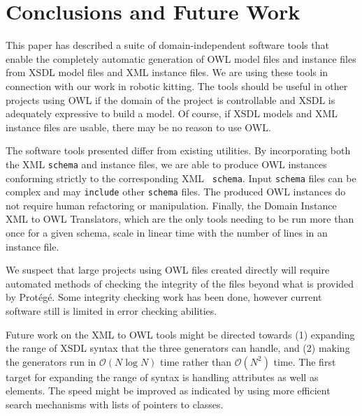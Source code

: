 \documentclass[preprint,12pt]{elsarticle}
\begin{document}
\section{Conclusions and Future Work}
\label{conclusion}

This paper has described a suite of domain-independent software tools that
enable the completely automatic generation of OWL model files and instance
files from XSDL model files and XML instance files. We are using these
tools in connection with our work in robotic kitting. The tools should be
useful in other projects using OWL if the domain of the project is
controllable and XSDL is adequately expressive to build a model. Of course,
if XSDL models and XML instance files are usable, there may be no reason to
use OWL.

The software tools presented differ from existing utilities. By
incorporating both the XML {\tt schema} and instance files, we are able to
produce OWL instances conforming strictly to the corresponding XML {\tt
  schema}. Input {\tt schema} files can be complex and may {\tt include}
other {\tt schema} files. The produced OWL instances do not require human
refactoring or manipulation. Finally, the Domain Instance XML to OWL
Translators, which are the only tools needing to be run more than once for
a given schema, scale in linear time with the number of lines in an
instance file.

We suspect that large projects using OWL files created directly will
require automated methods of checking the integrity of the files beyond
what is provided by Prot\'eg\'e. Some integrity checking work has been
done, however current software still is limited in error checking
abilities.

Future work on the XML to OWL tools might be directed towards (1) expanding
the range of XSDL syntax that the three generators can handle, and (2)
making the generators run in $\mathcal{O}{(N \log N)}$ time rather than
$\mathcal{O}{(N^2)}$ time. The first target for expanding the range of
syntax is handling attributes as well as elements. The speed might be
improved as indicated by using more efficient search mechanisms with
lists of pointers to classes.




\end{document}
